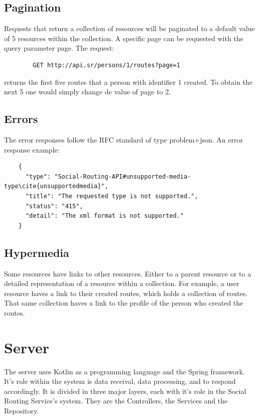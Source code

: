     \subsection*{Pagination}
    Requests that return a collection of resources will be paginated to a default value of 5 resources within the collection. 
    A specific page can be requested with the query parameter page. 
    The request:  
    \begin{verbatim}
        GET http://api.sr/persons/1/routes?page=1
    \end{verbatim}
    \vspace{-\baselineskip}
     returns the first five routes that a person with identifier 1 created.
    To obtain the next 5 one would simply change de value of page to 2.

    \subsection*{Errors}
    The error responses follow the RFC standard of type problem+json\cite{jsonproblemonlinedocs}. An error response example:
    
    \begin{lstlisting}
    {
      "type": "Social-Routing-API#unsupported-media-type\cite{unsupportedmedia}",
      "title": "The requested type is not supported.",
      "status": "415",
      "detail": "The xml format is not supported."
    }
    \end{lstlisting}

    \subsection*{Hypermedia}
    Some resources have links to other resources. Either to a parent resource or to a detailed representation of a 
    resource within a collection. For example, a user resource haves a link to their created routes, which 
    holds a collection of routes. That same collection haves a link to the profile of the person who created 
    the routes.
    \newpage

\section*{Server} 
The server uses Kotlin as a programming language and the Spring framework\cite{springwebsite}. 
It's role within the system is data receival, data processing, 
and to respond accordingly. It is divided in three major layers, each with it's role in the Social Routing Service's system. 
They are the Controllers, the Services and the Repository.

